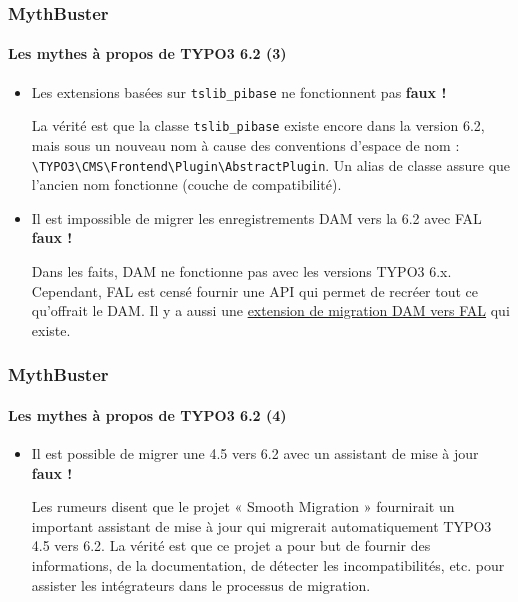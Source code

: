 \begin{frame}[fragile]
	\frametitle{MythBuster}
	\framesubtitle{Les mythes à propos de TYPO3 6.2 (3)}

	\begin{itemize}
		\item Les extensions basées sur \texttt{tslib\_pibase} ne fonctionnent pas
			\tabto{9cm}\color{red}\textbf{\textrightarrow faux !}\color{black}

			\smaller
				La vérité est que la classe \texttt{tslib\_pibase} existe encore dans la version 6.2, mais sous un nouveau nom à cause des conventions d'espace de nom : \texttt{\textbackslash TYPO3\textbackslash CMS\textbackslash Frontend\textbackslash Plugin\textbackslash AbstractPlugin}.\newline
				Un alias de classe assure que l'ancien nom fonctionne (couche de compatibilité).
			\normalsize

		\item Il est impossible de migrer les enregistrements DAM vers la 6.2 avec FAL
			\tabto{9cm}\color{red}\textbf{\textrightarrow faux !}\color{black}

			\smaller
				Dans les faits, DAM ne fonctionne pas avec les versions TYPO3 6.x. Cependant, FAL est censé fournir une API qui permet de recréer tout ce qu'offrait le DAM. Il y a aussi une \href{https://github.com/fnagel/t3ext-dam_falmigration}{extension de migration DAM vers FAL} qui existe.
			\normalsize
			
	\end{itemize}

\end{frame}


\begin{frame}[fragile]
	\frametitle{MythBuster}
	\framesubtitle{Les mythes à propos de TYPO3 6.2 (4)}

	\begin{itemize}
		\item Il est possible de migrer une 4.5 vers 6.2 avec un assistant de mise à jour
			\tabto{9cm}\color{red}\textbf{\textrightarrow faux !}\color{black}

			\smaller
				Les rumeurs disent que le projet « Smooth Migration » fournirait un important assistant de mise à jour qui migrerait automatiquement TYPO3 4.5 vers 6.2. La vérité est que ce projet a pour but de fournir des informations, de la documentation, de détecter les incompatibilités, etc. pour assister les intégrateurs dans le processus de migration.
			\normalsize

	\end{itemize}

\end{frame}

